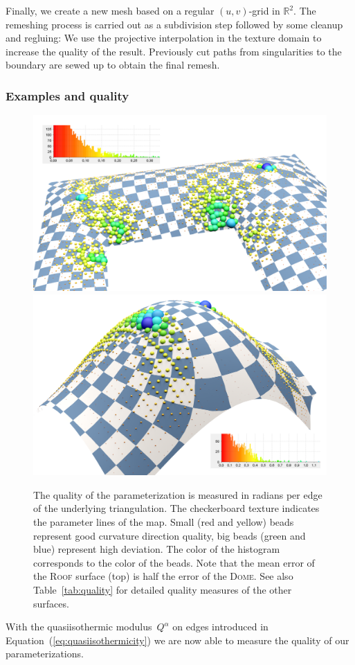 \documentclass[Thesis.tex]{subfiles}
\begin{document}
Finally, we create a new mesh based on a regular $(u,v)$-grid in $\mathbb R^2$. 
The remeshing process is carried out as a subdivision step followed by some cleanup
and regluing: We use the projective interpolation in the texture domain to 
increase the quality of the result. Previously cut paths from singularities to the 
boundary are sewed up to obtain the final remesh.

\subsubsection{Examples and quality}
\label{subsub:examples_quality}

\begin{figure}
\includegraphics[width=\linewidth]{image/aag2012/dach01_quality_highres.pdf}
\includegraphics[width=\linewidth]{image/aag2012/dach02_quality_highres.pdf}
\caption[Parameterization quality plot]{The quality of the parameterization is measured in radians per
edge of the underlying triangulation. The checkerboard texture indicates the parameter
lines of the map. Small (red and yellow) beads represent good curvature direction quality, big
beads (green and blue) represent high deviation. The color of the histogram
corresponds to the color of the beads. Note that the mean error of the \textsc{Roof} 
surface (top) is half the error of the \textsc{Dome}. See also Table~\ref{tab:quality} 
for detailed quality measures of the other surfaces.}
\label{fig:quality}
\end{figure}
With the quasiisothermic modulus~$Q^\alpha$ on edges introduced in
Equation~(\ref{eq:quasiisothermicity}) we are now able to measure the 
quality of our parameterizations. 
\end{document}
